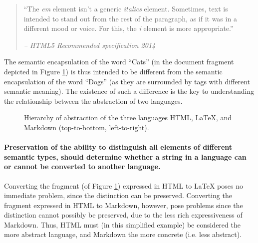 \documentclass{scrreprt}
\begin{document}
\begin{quote}
``The \emph{em} element isn't a generic \emph{italics} element. Sometimes, text is intended to stand out from the rest of the paragraph, as if it was in a different mood or voice. For this, the \emph{i} element is more appropriate.''
\begin{flushright}
\textit{-- HTML5 Recommended specification 2014}
\end{flushright}
\end{quote}

The semantic encapsulation of the word ``Cats'' (in the document fragment depicted in Figure \ref{fig:hierarchy-of-abstraction-example-tree}) is thus intended to be different from the semantic encapsulation of the word ``Dogs'' (as they are surrounded by tags with different semantic meaning). The existence of such a difference is the key to understanding the relationship between the abstraction of two languages.

\begin{figure}[h]
  \centering

  \caption{Hierarchy of abstraction of the three languages HTML, \LaTeX, and Markdown (top-to-bottom, left-to-right).}
  \label{fig:hierarchy-of-abstraction-example-tree}
\end{figure}

\paragraph{Preservation of the ability to distinguish all elements of different semantic types, should determine whether a string in a language can or cannot be converted to another language.}

Converting the fragment (of Figure \ref{fig:hierarchy-of-abstraction-example-tree}) expressed in HTML to \LaTeX{} poses no immediate problem, since the distinction can be preserved. Converting the fragment expressed in HTML to Markdown, however, pose problems since the distinction cannot possibly be preserved, due to the less rich expressiveness of Markdown. Thus, HTML must (in this simplified example) be considered the more abstract language, and Markdown the more concrete (i.e. less abstract).
\end{document}
